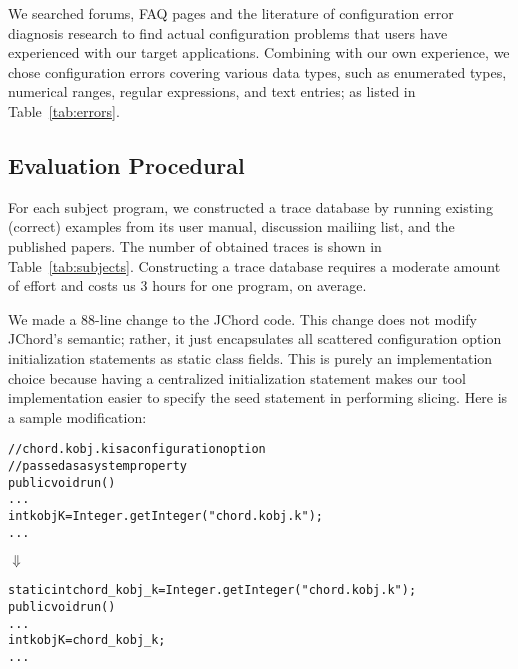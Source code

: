 We searched forums, FAQ pages and the literature of
configuration error diagnosis research to find actual
configuration problems that users have experienced with our
target applications. Combining with our own experience,
we chose \errors configuration errors
covering various data types, such as enumerated types,
numerical ranges, regular expressions, and text entries;
as listed in Table~\ref{tab:errors}.

\subsection{Evaluation Procedural}

For each subject program, we constructed a trace database
by running existing (correct) examples from its user manual, discussion
mailiing list, and the published papers. The number of obtained
 traces is shown in Table~\ref{tab:subjects}. 
Constructing a trace database requires a moderate amount of
effort and costs us 3 hours for one program, on average.


We made a 88-line change to the JChord code. This change
does not modify JChord's semantic; rather, it just encapsulates
all scattered configuration option initialization statements 
as static class fields. This is purely an implementation
choice because having a centralized initialization statement
makes our tool implementation easier to specify the seed statement
in performing slicing. Here is a sample modification:



\begin{CodeOut}
\begin{alltt}
   // chord.kobj.k is a configuration option
   // passed as a system property
   public void run() \ttlcb
     ...
     int kobjK = Integer.getInteger("chord.kobj.k");
     ...
   \ttrcb
\end{alltt}
\end{CodeOut}
\vspace{-4mm}
\hspace{20mm}$\Downarrow$ 
\begin{CodeOut}
\begin{alltt}
   static int chord\_kobj\_k = Integer.getInteger("chord.kobj.k");
   public void run() \ttlcb
     ...
     int kobjK = chord\_kobj\_k; 
     ...
   \ttrcb
\end{alltt}
\end{CodeOut}



